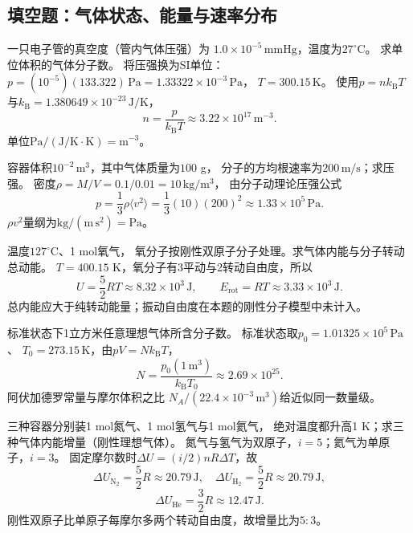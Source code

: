\subsection{填空题：气体状态、能量与速率分布}

\problemtext 一只电子管的真空度（管内气体压强）为
$1.0\times10^{-5}\,\mathrm{mmHg}$，温度为$27^\circ\mathrm C$。
求单位体积的气体分子数。
\workings
将压强换为SI单位：
$p=(10^{-5})(133.322)\,\mathrm{Pa}=1.33322\times10^{-3}\,\mathrm{Pa}$，
$T=300.15\,\mathrm K$。
使用$p=nk_{\mathrm B}T$与$k_{\mathrm B}=1.380649\times10^{-23}\,\mathrm{J/K}$，
\[
\boxed{n=\frac p{k_{\mathrm B}T}
\approx3.22\times10^{17}\,\mathrm{m^{-3}}}.
\]
\crosscheck 单位$\mathrm{Pa}/(\mathrm{J/K}\cdot\mathrm K)=\mathrm{m^{-3}}$。

\problemtext 容器体积$10^{-2}\,\mathrm{m^3}$，其中气体质量为$100$ g，
分子的方均根速率为$200\,\mathrm{m/s}$；求压强。
\workings
密度$\rho=M/V=0.1/0.01=10\,\mathrm{kg/m^3}$，
由分子动理论压强公式
\[
\boxed{p=\frac13\rho\langle v^2\rangle
=\frac13(10)(200)^2
\approx1.33\times10^5\,\mathrm{Pa}}.
\]
\crosscheck $\rho v^2$量纲为$\mathrm{kg/(m\,s^2)}=\mathrm{Pa}$。

\problemtext 温度$127^\circ\mathrm C$、1 mol氧气，
氧分子按刚性双原子分子处理。求气体内能与分子转动总动能。
\workings
$T=400.15$ K，氧分子有3平动与2转动自由度，所以
\[
\boxed{U=\frac52RT
\approx8.32\times10^3\,\mathrm J},\qquad
\boxed{E_{\mathrm{rot}}=RT\approx3.33\times10^3\,\mathrm J}.
\]
\crosscheck 总内能应大于纯转动能量；振动自由度在本题的刚性分子模型中未计入。

\problemtext 标准状态下1立方米任意理想气体所含分子数。
\workings
标准状态取$p_0=1.01325\times10^5\,\mathrm{Pa}$、
$T_0=273.15\,\mathrm K$，由$pV=Nk_{\mathrm B}T$，
\[
\boxed{N=\frac{p_0(1\,\mathrm{m^3})}{k_{\mathrm B}T_0}
\approx2.69\times10^{25}}.
\]
\crosscheck 阿伏加德罗常量与摩尔体积之比
$N_A/(22.4\times10^{-3}\,\mathrm{m^3})$给近似同一数量级。

\problemtext 三种容器分别装1 mol氮气、1 mol氢气与1 mol氦气，
绝对温度都升高1 K；求三种气体内能增量（刚性理想气体）。
\workings
氮气与氢气为双原子，$i=5$；氦气为单原子，$i=3$。
固定摩尔数时$\Delta U=(i/2)nR\Delta T$，故
\[
\boxed{\Delta U_{\mathrm{N_2}}=\frac52R
\approx20.79\,\mathrm J},\quad
\boxed{\Delta U_{\mathrm{H_2}}=\frac52R
\approx20.79\,\mathrm J},
\]
\[
\boxed{\Delta U_{\mathrm{He}}=\frac32R\approx12.47\,\mathrm J}.
\]
\crosscheck 刚性双原子比单原子每摩尔多两个转动自由度，故增量比为$5:3$。

